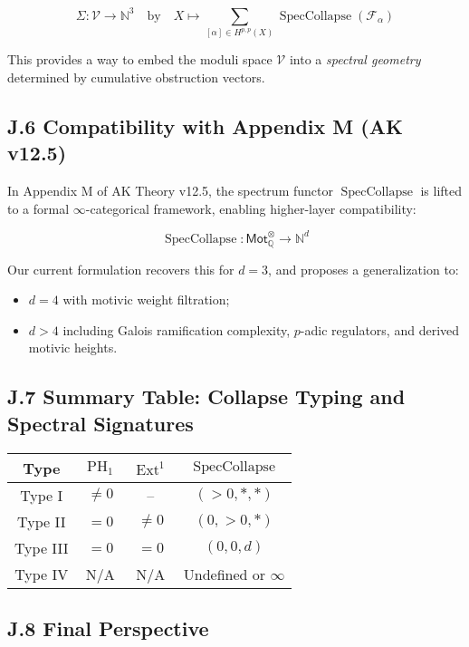 \documentclass[11pt]{article}
\DeclareMathOperator{\Ext}{Ext}
\DeclareMathOperator{\PH}{PH}
\begin{document}
\[
\Sigma: \mathcal{V} \to \mathbb{N}^3
\quad \text{by} \quad
X \mapsto \sum_{[\alpha] \in H^{p,p}(X)} \operatorname{SpecCollapse}(\mathcal{F}_\alpha)
\]

This provides a way to embed the moduli space $\mathcal{V}$ into a \emph{spectral geometry} determined by cumulative obstruction vectors.

\subsection*{J.6 Compatibility with Appendix M (AK v12.5)}

In Appendix M of AK Theory v12.5, the spectrum functor $\operatorname{SpecCollapse}$ is lifted to a formal $\infty$-categorical framework, enabling higher-layer compatibility:

\[
\operatorname{SpecCollapse}: \mathsf{Mot}_\mathbb{Q}^{\otimes} \to \mathbb{N}^d
\]

Our current formulation recovers this for $d=3$, and proposes a generalization to:

\begin{itemize}
  \item $d = 4$ with motivic weight filtration;
  \item $d > 4$ including Galois ramification complexity, $p$-adic regulators, and derived motivic heights.
\end{itemize}

\subsection*{J.7 Summary Table: Collapse Typing and Spectral Signatures}

\begin{center}
\begin{tabular}{|c|c|c|c|}
\hline
\textbf{Type} & $\PH_1$ & $\Ext^1$ & $\operatorname{SpecCollapse}$ \\
\hline
Type I & $\ne 0$ & -- & $(>0, *, *)$ \\
Type II & $= 0$ & $\ne 0$ & $(0, >0, *)$ \\
Type III & $= 0$ & $= 0$ & $(0, 0, d)$ \\
Type IV & N/A & N/A & Undefined or $\infty$ \\
\hline
\end{tabular}
\end{center}

\subsection*{J.8 Final Perspective}
\end{document}

